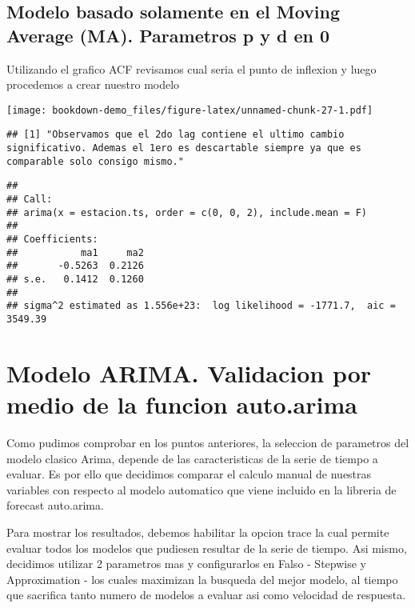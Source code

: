 \documentclass[
]{book}
\begin{document}
\hypertarget{modelo-basado-solamente-en-el-moving-average-ma.-parametros-p-y-d-en-0}{%
\subsection{Modelo basado solamente en el Moving Average (MA). Parametros p y d en 0}\label{modelo-basado-solamente-en-el-moving-average-ma.-parametros-p-y-d-en-0}}

Utilizando el grafico ACF revisamos cual seria el punto de inflexion y luego procedemos a crear nuestro modelo

\texttt{[image: bookdown-demo\_files/figure-latex/unnamed-chunk-27-1.pdf]}

\begin{verbatim}
## [1] "Observamos que el 2do lag contiene el ultimo cambio significativo. Ademas el 1ero es descartable siempre ya que es comparable solo consigo mismo."
\end{verbatim}

\begin{verbatim}
## 
## Call:
## arima(x = estacion.ts, order = c(0, 0, 2), include.mean = F)
## 
## Coefficients:
##           ma1     ma2
##       -0.5263  0.2126
## s.e.   0.1412  0.1260
## 
## sigma^2 estimated as 1.556e+23:  log likelihood = -1771.7,  aic = 3549.39
\end{verbatim}

\hypertarget{modelo-arima.-validacion-por-medio-de-la-funcion-auto.arima}{%
\section{Modelo ARIMA. Validacion por medio de la funcion auto.arima}\label{modelo-arima.-validacion-por-medio-de-la-funcion-auto.arima}}

Como pudimos comprobar en los puntos anteriores, la seleccion de parametros del modelo clasico Arima, depende de las caracteristicas de la serie de tiempo a evaluar. Es por ello que decidimos comparar el calculo manual de nuestras variables con respecto al modelo automatico que viene incluido en la libreria de forecast auto.arima.

Para mostrar los resultados, debemos habilitar la opcion trace la cual permite evaluar todos los modelos que pudiesen resultar de la serie de tiempo. Asi mismo, decidimos utilizar 2 parametros mas y configurarlos en Falso - Stepwise y Approximation - los cuales maximizan la busqueda del mejor modelo, al tiempo que sacrifica tanto numero de modelos a evaluar asi como velocidad de respuesta.
\end{document}
